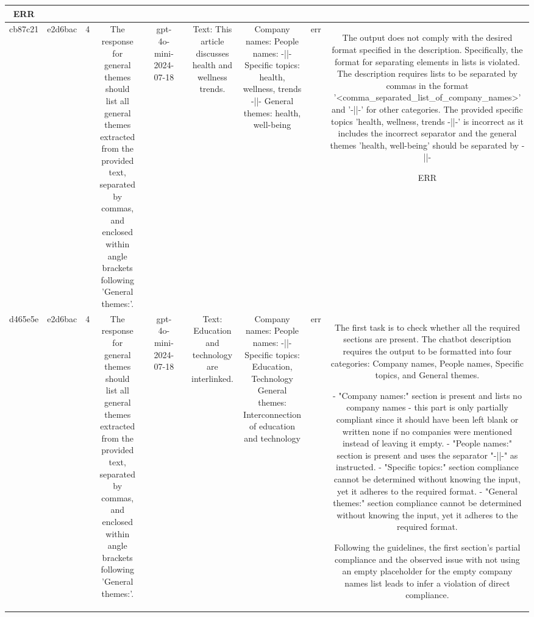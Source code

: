 \begin{table}[h!]
\begin{tabular}{|c|c|c|c|c|c|c|c|c|c|c|}
ERR\\
\hline
cb87c21 & e2d6bac & 4 & The response for general themes should list all general themes extracted from the provided text, separated by commas, and enclosed within angle brackets following 'General themes:'. &  & gpt-4o-mini-2024-07-18 &  & Text: This article discusses health and wellness trends. & Company names: 
People names: -||-
Specific topics: health, wellness, trends -||-
General themes: health, well-being & err & The output does not comply with the desired format specified in the description. Specifically, the format for separating elements in lists is violated. The description requires lists to be separated by commas in the format '<comma_separated_list_of_company_names>' and '-||-' for other categories. The provided specific topics 'health, wellness, trends -||-' is incorrect as it includes the incorrect separator and the general themes 'health, well-being' should be separated by -||-

ERR\\
\hline
d465e5e & e2d6bac & 4 & The response for general themes should list all general themes extracted from the provided text, separated by commas, and enclosed within angle brackets following 'General themes:'. &  & gpt-4o-mini-2024-07-18 &  & Text: Education and technology are interlinked. & Company names: 
People names: -||-
Specific topics: Education, Technology
General themes: Interconnection of education and technology & err & The first task is to check whether all the required sections are present. The chatbot description requires the output to be formatted into four categories: Company names, People names, Specific topics, and General themes. 

- "Company names:" section is present and lists no company names - this part is only partially compliant since it should have been left blank or written none if no companies were mentioned instead of leaving it empty.
- "People names:" section is present and uses the separator "-||-" as instructed.
- "Specific topics:" section compliance cannot be determined without knowing the input, yet it adheres to the required format.
- "General themes:" section compliance cannot be determined without knowing the input, yet it adheres to the required format.

Following the guidelines, the first section's partial compliance and the observed issue with not using an empty placeholder for the empty company names list leads to infer a violation of direct compliance.


\end{tabular}
\end{table}
